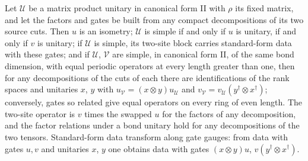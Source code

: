\begin{lemma}
    \label{thm:mpu_gate_statements_any_svd}
    \leanok
    Let $\mathcal U$ be a matrix product unitary in canonical form II with
    $\rho$ its fixed matrix, and let the factors and gates be built from any
    compact decompositions of its two source cuts. Then $u$ is an isometry;
    $\mathcal U$ is simple if and only if $u$ is unitary, if and only if $v$ is
    unitary; if $\mathcal U$ is simple, its two-site block carries standard-form
    data with these gates; and if $\mathcal U$, $\mathcal V$ are simple, in
    canonical form II, of the same bond dimension, with equal periodic
    operators at every length greater than one, then for any decompositions of the cuts of each there are
    identifications of the rank spaces and unitaries $x$, $y$ with
    $u_{\mathcal V}=(x\otimes y)u_{\mathcal U}$ and
    $v_{\mathcal V}=v_{\mathcal U}(y^\dagger\otimes x^\dagger)$; conversely, gates so
    related give equal operators on every ring of even length. The two-site
    operator is $v$ times the swapped $u$ for the factors of any decomposition,
    and the factor relations under a bond unitary hold for any decompositions
    of the two tensors. Standard-form data transform along gate gauges: from data with gates $u,v$ and unitaries
    $x$, $y$ one obtains data with gates $(x\otimes y)u$, $v(y^\dagger\otimes x^\dagger)$.
\end{lemma}

